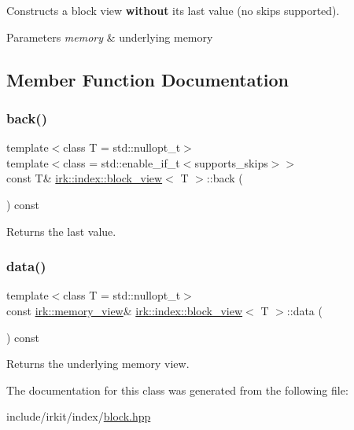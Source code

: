 Constructs a block view {\bfseries without} its last value (no skips supported). 
\begin{DoxyParams}{Parameters}
{\em memory} & underlying memory \\
\hline
\end{DoxyParams}


\subsection{Member Function Documentation}
\mbox{\label{classirk_1_1index_1_1block__view_a88f00828b2dd384cb925022a3333fdf7}} 
\subsubsection{\texorpdfstring{back()}{back()}}
{\footnotesize\ttfamily template$<$class T  = std\+::nullopt\+\_\+t$>$ \\
template$<$class  = std\+::enable\+\_\+if\+\_\+t$<$supports\+\_\+skips$>$$>$ \\
const T\& \mbox{\hyperlink{classirk_1_1index_1_1block__view}{irk\+::index\+::block\+\_\+view}}$<$ T $>$\+::back (\begin{DoxyParamCaption}{ }\end{DoxyParamCaption}) const\hspace{0.3cm}{\ttfamily [inline]}}



Returns the last value. 

\mbox{\label{classirk_1_1index_1_1block__view_a90c3c66aad54b62b4378b4a653fb4260}} 
\subsubsection{\texorpdfstring{data()}{data()}}
{\footnotesize\ttfamily template$<$class T  = std\+::nullopt\+\_\+t$>$ \\
const \mbox{\hyperlink{classirk_1_1memory__view}{irk\+::memory\+\_\+view}}\& \mbox{\hyperlink{classirk_1_1index_1_1block__view}{irk\+::index\+::block\+\_\+view}}$<$ T $>$\+::data (\begin{DoxyParamCaption}{ }\end{DoxyParamCaption}) const\hspace{0.3cm}{\ttfamily [inline]}}



Returns the underlying memory view. 



The documentation for this class was generated from the following file\+:\begin{DoxyCompactItemize}
\item 
include/irkit/index/\mbox{\hyperlink{block_8hpp}{block.\+hpp}}\end{DoxyCompactItemize}
